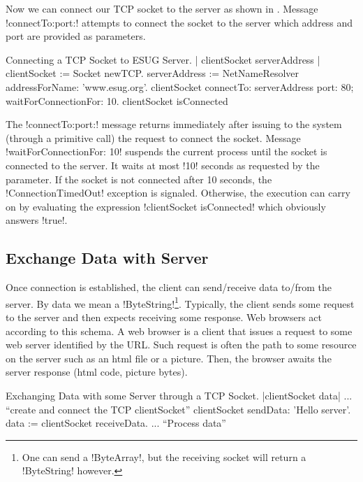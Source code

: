\documentclass[a4paper,10pt,twoside]{book}
\begin{document}
Now we can connect our TCP socket to the server as shown in .
Message \ct!connectTo:port:! attempts to connect the socket to the server which address and port are provided as parameters.

\begin{script}[connectingTcpSocket]{Connecting a TCP Socket to ESUG Server.}
| clientSocket serverAddress |
clientSocket := Socket newTCP.
serverAddress := NetNameResolver addressForName: 'www.esug.org'.
clientSocket 
	connectTo: serverAddress port: 80;
	waitForConnectionFor: 10.
clientSocket isConnected
\end{script}

The \ct!connectTo:port:!  message returns immediately after issuing to the system (through a primitive call) the request to connect the socket.
Message \ct!waitForConnectionFor: 10! suspends the current process until the socket is connected to the server.
It waits at most \ct!10! seconds as requested by the parameter.
If the socket is not connected after 10 seconds, the \ct!ConnectionTimedOut! exception is signaled. 
Otherwise, the execution can carry on by evaluating the expression \ct!clientSocket isConnected! which obviously answers \ct!true!.



\subsection{Exchange Data with Server}
\label{sec:exchangeData}
Once connection is established, the client can send/receive data to/from the server.
By data we mean a \ct!ByteString!\footnote{One can send a \ct!ByteArray!, but the receiving socket will return a \ct!ByteString! however.}.
Typically, the client sends some request to the server and then expects receiving some response.
Web browsers act according to this schema.
A web browser is a client that issues a request to some web server identified by the URL.
Such request is often the path to some resource on the server such as an html file or a picture.
Then, the browser awaits the server response (\eg html code, picture bytes).

\begin{script}[dataExhangeWithTcpSocket]{Exchanging Data with some Server through a TCP Socket.}
|clientSocket data|
... ``create and connect the TCP clientSocket''
clientSocket sendData: 'Hello server'.
data := clientSocket receiveData.
... ``Process data''
\end{script}
\end{document}

